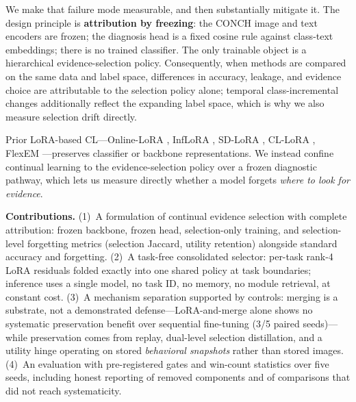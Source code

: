 \documentclass{article}
\begin{document}
We make that failure mode measurable, and then substantially mitigate it. The design principle is \textbf{attribution by freezing}: the CONCH image and text encoders \cite{lu2024conch} are frozen; the diagnosis head is a fixed cosine rule against class-text embeddings; there is no trained classifier. The only trainable object is a hierarchical evidence-selection policy. Consequently, when methods are compared on the same data and label space, differences in accuracy, leakage, and evidence choice are attributable to the selection policy alone; temporal class-incremental changes additionally reflect the expanding label space, which is why we also measure selection drift directly.

Prior LoRA-based CL---Online-LoRA \cite{wei2025onlinelora}, InfLoRA \cite{liang2024inflora}, SD-LoRA \cite{wu2025sdlora}, CL-LoRA \cite{he2025cllora}, FlexEM \cite{chen2026flexem}---preserves classifier or backbone representations. We instead confine continual learning to the evidence-selection policy over a frozen diagnostic pathway, which lets us measure directly whether a model forgets \emph{where to look for evidence}.

\textbf{Contributions.}
(1)~A formulation of continual evidence selection with complete attribution: frozen backbone, frozen head, selection-only training, and selection-level forgetting metrics (selection Jaccard, utility retention) alongside standard accuracy and forgetting.
(2)~A task-free consolidated selector: per-task rank-4 LoRA residuals folded exactly into one shared policy at task boundaries; inference uses a single model, no task ID, no memory, no module retrieval, at constant cost.
(3)~A mechanism separation supported by controls: merging is a substrate, not a demonstrated defense---LoRA-and-merge alone shows no systematic preservation benefit over sequential fine-tuning (3/5 paired seeds)---while preservation comes from replay, dual-level selection distillation, and a utility hinge operating on stored \emph{behavioral snapshots} rather than stored images.
(4)~An evaluation with pre-registered gates and win-count statistics over five seeds, including honest reporting of removed components and of comparisons that did not reach systematicity.
\end{document}
